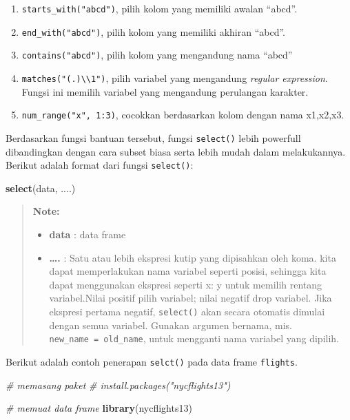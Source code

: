 \documentclass[]{book}
\newenvironment{Shaded}{\begin{snugshade}}{\end{snugshade}}
\newcommand{\KeywordTok}[1]{\textcolor[rgb]{0.13,0.29,0.53}{\textbf{#1}}}
\newcommand{\CommentTok}[1]{\textcolor[rgb]{0.56,0.35,0.01}{\textit{#1}}}
\newcommand{\NormalTok}[1]{#1}
\providecommand{\tightlist}{%
  \setlength{\itemsep}{0pt}\setlength{\parskip}{0pt}}
\begin{document}
\begin{enumerate}
\def\labelenumi{\arabic{enumi}.}
\tightlist
\item
  \texttt{starts\_with("abcd")}, pilih kolom yang memiliki awalan
  ``abcd''.
\item
  \texttt{end\_with("abcd")}, pilih kolom yang memiliki akhiran
  ``abcd''.
\item
  \texttt{contains("abcd")}, pilih kolom yang mengandung nama ``abcd''
\item
  \texttt{matches("(.)\textbackslash{}\textbackslash{}1")}, pilih
  variabel yang mengandung \emph{regular expression}. Fungsi ini memilih
  variabel yang mengandung perulangan karakter.
\item
  \texttt{num\_range("x",\ 1:3)}, cocokkan berdasarkan kolom dengan nama
  x1,x2,x3.
\end{enumerate}

Berdasarkan fungsi bantuan tersebut, fungsi \texttt{select()} lebih
powerfull dibandingkan dengan cara subset biasa serta lebih mudah dalam
melakukannya. Berikut adalah format dari fungsi \texttt{select()}:

\begin{Shaded}
\begin{Highlighting}[]
\KeywordTok{select}\NormalTok{(data, ....)}
\end{Highlighting}
\end{Shaded}

\begin{quote}
\textbf{Note: }

\begin{itemize}
\tightlist
\item
  \textbf{data} : data frame
\item
  \textbf{\ldots{}.} : Satu atau lebih ekspresi kutip yang dipisahkan
  oleh koma. kita dapat memperlakukan nama variabel seperti posisi,
  sehingga kita dapat menggunakan ekspresi seperti x: y untuk memilih
  rentang variabel.Nilai positif pilih variabel; nilai negatif drop
  variabel. Jika ekspresi pertama negatif, \texttt{select()} akan secara
  otomatis dimulai dengan semua variabel. Gunakan argumen bernama, mis.
  \texttt{new\_name\ =\ old\_name}, untuk mengganti nama variabel yang
  dipilih.
\end{itemize}
\end{quote}

Berikut adalah contoh penerapan \texttt{selct()} pada data frame
\texttt{flights}.

\begin{Shaded}
\begin{Highlighting}[]
\CommentTok{# memasang paket}
\CommentTok{# install.packages("nycflights13")}

\CommentTok{# memuat data frame}
\KeywordTok{library}\NormalTok{(nycflights13)}
\end{Highlighting}
\end{Shaded}
\end{document}
